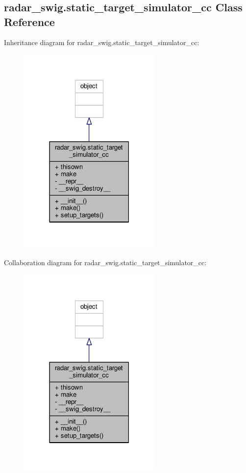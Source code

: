 \subsection{radar\+\_\+swig.\+static\+\_\+target\+\_\+simulator\+\_\+cc Class Reference}
\label{classradar__swig_1_1static__target__simulator__cc}


Inheritance diagram for radar\+\_\+swig.\+static\+\_\+target\+\_\+simulator\+\_\+cc\+:
\nopagebreak
\begin{figure}[H]
\begin{center}
\leavevmode
\includegraphics[width=201pt]{d2/de9/classradar__swig_1_1static__target__simulator__cc__inherit__graph}
\end{center}
\end{figure}


Collaboration diagram for radar\+\_\+swig.\+static\+\_\+target\+\_\+simulator\+\_\+cc\+:
\nopagebreak
\begin{figure}[H]
\begin{center}
\leavevmode
\includegraphics[width=201pt]{d8/d84/classradar__swig_1_1static__target__simulator__cc__coll__graph}
\end{center}
\end{figure}
